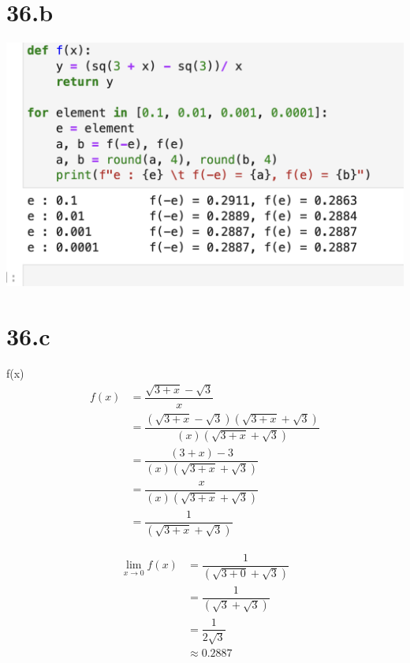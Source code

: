 \documentclass{article}
\begin{document}
\section{36.b}
\includegraphics[scale=0.3]{table.png} \\

\section{36.c}
 f(x) \\

\begin{equation}
    \label{eq1}
    \begin{split}
    f(x) &= \dfrac{ \sqrt{3 + x} - \sqrt{3} }{ x } \\

    &= \dfrac {
        (\sqrt{3 + x} - \sqrt{3})
        (\sqrt{3 + x} + \sqrt{3})
    }
    {
        (x)
        (\sqrt{3 + x} + \sqrt{3})
    } \\


    &= \dfrac{
        (3 + x) - 3
    }
    {
        (x)
        (\sqrt{3 + x} + \sqrt{3})
    } \\

    &= \dfrac{
        x
    }
    {
        (x)
        (\sqrt{3 + x} + \sqrt{3})
    } \\

    &= \dfrac{ 1 }
    {
        (\sqrt{3 + x} + \sqrt{3})
    }
    \end{split}
\end{equation}

\begin{equation}
    \label{eq2}
    \begin{split}
    \lim_{x \to 0} f(x) &= \dfrac{ 1 } { (\sqrt{3 + 0} + \sqrt{3}) } \\
    &= \dfrac{ 1 } { (\sqrt{3} + \sqrt{3}) } \\
    &= \dfrac{ 1 } { 2\sqrt{3} } \\
    &\approx 0.2887
    \end{split}
\end{equation}
\end{document}
